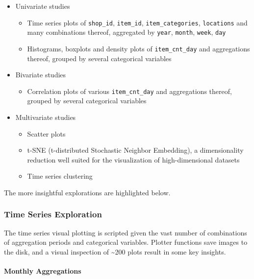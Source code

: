 \documentclass[floatsintext,man]{apa6}
\providecommand{\tightlist}{%
  \setlength{\itemsep}{0pt}\setlength{\parskip}{0pt}}
\theoremstyle{definition}
\theoremstyle{definition}
\theoremstyle{definition}
\theoremstyle{remark}
\begin{document}
\begin{itemize}
\tightlist
\item
  Univariate studies

  \begin{itemize}
  \tightlist
  \item
    Time series plots of \texttt{shop\_id}, \texttt{item\_id},
    \texttt{item\_categories}, \texttt{locations} and many combinations
    thereof, aggregated by \texttt{year}, \texttt{month}, \texttt{week},
    \texttt{day}
  \item
    Histograms, boxplots and density plots of \texttt{item\_cnt\_day}
    and aggregations thereof, grouped by several categorical variables
  \end{itemize}
\item
  Bivariate studies

  \begin{itemize}
  \tightlist
  \item
    Correlation plots of various \texttt{item\_cnt\_day} and
    aggregations thereof, grouped by several categorical variables
  \end{itemize}
\item
  Multivariate studies

  \begin{itemize}
  \tightlist
  \item
    Scatter plots
  \item
    t-SNE (t-distributed Stochastic Neighbor Embedding), a
    dimensionality reduction well suited for the visualization of
    high-dimensional datasets
  \item
    Time series clustering
  \end{itemize}
\end{itemize}

The more insightful explorations are highlighted below.

\subsubsection{Time Series Exploration}\label{time-series-exploration}

The time series visual plotting is scripted given the vast number of
combinations of aggregation periods and categorical variables. Plotter
functions save images to the disk, and a visual inspection of
\textasciitilde{}200 plots result in some key insights.

\paragraph{Monthly Aggregations}\label{monthly-aggregations}
\end{document}
